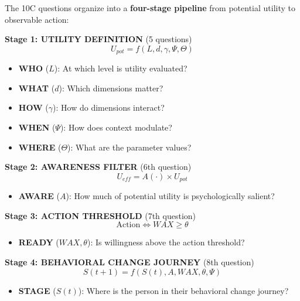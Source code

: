 The 10C questions organize into a \textbf{four-stage pipeline} from potential
utility to observable action:

\begin{tcolorbox}[colback=blue!5!white, colframe=blue!75!black,
    title=\textbf{The EBF Pipeline: From Utility to Behavioral Change}]

\textbf{Stage 1: UTILITY DEFINITION} (5 questions)
\begin{equation}
U_{pot} = f(L, d, \gamma, \Psi, \Theta)
\end{equation}
\begin{itemize}[nosep]
\item \textbf{WHO} ($L$): At which level is utility evaluated?
\item \textbf{WHAT} ($d$): Which dimensions matter?
\item \textbf{HOW} ($\gamma$): How do dimensions interact?
\item \textbf{WHEN} ($\Psi$): How does context modulate?
\item \textbf{WHERE} ($\Theta$): What are the parameter values?
\end{itemize}

\vspace{0.3cm}
\textbf{Stage 2: AWARENESS FILTER} (6th question)
\begin{equation}
U_{eff} = A(\cdot) \times U_{pot}
\end{equation}
\begin{itemize}[nosep]
\item \textbf{AWARE} ($A$): How much of potential utility is psychologically salient?
\end{itemize}

\vspace{0.3cm}
\textbf{Stage 3: ACTION THRESHOLD} (7th question)
\begin{equation}
\text{Action} \Leftrightarrow WAX \geq \theta
\end{equation}
\begin{itemize}[nosep]
\item \textbf{READY} ($WAX, \theta$): Is willingness above the action threshold?
\end{itemize}

\vspace{0.3cm}
\textbf{Stage 4: BEHAVIORAL CHANGE JOURNEY} (8th question)
\begin{equation}
S(t+1) = f(S(t), A, WAX, \theta, \Psi)
\end{equation}
\begin{itemize}[nosep]
\item \textbf{STAGE} ($S(t)$): Where is the person in their behavioral change journey?
\end{itemize}

\end{tcolorbox}

